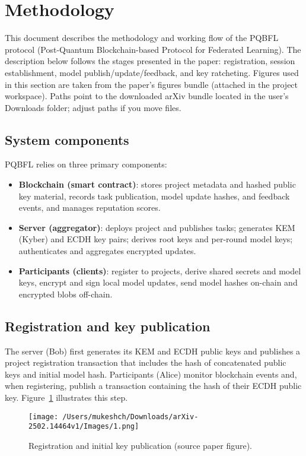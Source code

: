 \documentclass[11pt]{article}
\begin{document}
\section*{Methodology}
\label{sec:methodology}

This document describes the methodology and working flow of the PQBFL protocol (Post-Quantum Blockchain-based Protocol for Federated Learning). The description below follows the stages presented in the paper: registration, session establishment, model publish/update/feedback, and key ratcheting. Figures used in this section are taken from the paper's figures bundle (attached in the project workspace). Paths point to the downloaded arXiv bundle located in the user's Downloads folder; adjust paths if you move files.

\subsection*{System components}
PQBFL relies on three primary components:
\begin{itemize}
  \item \textbf{Blockchain (smart contract)}: stores project metadata and hashed public key material, records task publication, model update hashes, and feedback events, and manages reputation scores.
  \item \textbf{Server (aggregator)}: deploys project and publishes tasks; generates KEM (Kyber) and ECDH key pairs; derives root keys and per-round model keys; authenticates and aggregates encrypted updates.
  \item \textbf{Participants (clients)}: register to projects, derive shared secrets and model keys, encrypt and sign local model updates, send model hashes on-chain and encrypted blobs off-chain.
\end{itemize}

\subsection*{Registration and key publication}
The server (Bob) first generates its KEM and ECDH public keys and publishes a project registration transaction that includes the hash of concatenated public keys and initial model hash. Participants (Alice) monitor blockchain events and, when registering, publish a transaction containing the hash of their ECDH public key. Figure~\ref{fig:registration} illustrates this step.

\begin{figure}[H]
  \centering
  \texttt{[image: /Users/mukeshch/Downloads/arXiv-2502.14464v1/Images/1.png]}
  \caption{Registration and initial key publication (source paper figure).}
  \label{fig:registration}
\end{figure}
\end{document}
